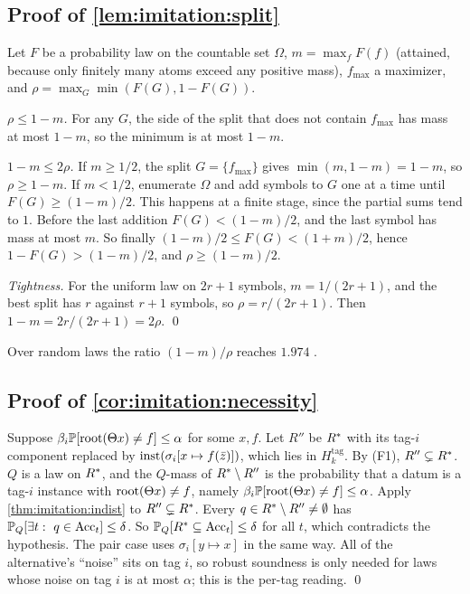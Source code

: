\subsection{Proof of \texorpdfstring{\cref{lem:imitation:split}}{the balanced-split lemma}}\label{app:imitation:split}

Let $F$ be a probability law on the countable set $\Omega$, $m=\max_fF(f)$ (attained, because only finitely many atoms exceed any positive mass), $f_{\max}$ a maximizer, and $\rho=\max_G\min(F(G),1-F(G))$.

\emph{$\rho\le1-m$.} For any $G$, the side of the split that does not contain $f_{\max}$ has mass at most $1-m$, so the minimum is at most $1-m$.

\emph{$1-m\le2\rho$.} If $m\ge1/2$, the split $G=\{f_{\max}\}$ gives $\min(m,1-m)=1-m$, so $\rho\ge1-m$. If $m<1/2$, enumerate $\Omega$ and add symbols to $G$ one at a time until $F(G)\ge(1-m)/2$. This happens at a finite stage, since the partial sums tend to $1$. Before the last addition $F(G)<(1-m)/2$, and the last symbol has mass at most $m$. So finally $(1-m)/2\le F(G)<(1+m)/2$, hence $1-F(G)>(1-m)/2$, and $\rho\ge(1-m)/2$.

\emph{Tightness.} For the uniform law on $2r+1$ symbols, $m=1/(2r+1)$, and the best split has $r$ against $r+1$ symbols, so $\rho=r/(2r+1)$. Then $1-m=2r/(2r+1)=2\rho$. \qed

Over random laws the ratio $(1-m)/\rho$ reaches $1.974$ .

\subsection{Proof of \texorpdfstring{\cref{cor:imitation:necessity}}{the necessity corollary}}\label{app:imitation:necessity}

Suppose $\beta_i\mathbb{P}[\mathrm{root}(\Theta x)\neq f]\le\alpha$ for some $x,f$. Let $R''$ be $R^{*}$ with its tag-$i$ component replaced by $\mathrm{inst}(\sigma_i[x\mapsto f(\bar z)])$, which lies in $H^{\mathrm{tag}}_k$. By (F1), $R''\subsetneq R^{*}$. $Q$ is a law on $R^{*}$, and the $Q$-mass of $R^{*}\setminus R''$ is the probability that a datum is a tag-$i$ instance with $\mathrm{root}(\Theta x)\neq f$, namely $\beta_i\mathbb{P}[\mathrm{root}(\Theta x)\neq f]\le\alpha$. Apply \cref{thm:imitation:indist} to $R''\subsetneq R^{*}$. Every $q\in R^{*}\setminus R''\neq\emptyset$ has $\Prob_Q[\exists t:\ q\in\Acc_t]\le\delta$. So $\mathbb{P}_Q[R^{*}\subseteq\mathrm{Acc}_t]\le\delta$ for all $t$, which contradicts the hypothesis. The pair case uses $\sigma_i[y\mapsto x]$ in the same way. All of the alternative's ``noise'' sits on tag $i$, so robust soundness is only needed for laws whose noise on tag $i$ is at most $\alpha$; this is the per-tag reading. \qed


